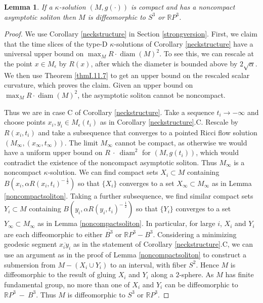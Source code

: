 \documentclass[12pt]{amsart}
\newcommand{\diam}{\operatorname{diam}}
\newcommand{\R}{{\mathbb R}}
\numberwithin{equation}{section}
\theoremstyle{plain}
\newtheorem{lemma}[equation]{Lemma}
\theoremstyle{definition}
\theoremstyle{remark}
\begin{document}
\begin{lemma} \label{S3RP3}
If a $\kappa$-solution $(M, g(\cdot))$
is compact and has a noncompact asymptotic soliton 
then $M$ is diffeomorphic to $S^3$ or $\R P^3$.
\end{lemma}
\begin{proof}
We use Corollary \ref{neckstructure} in Section \ref{strongversion}.
First, we claim that the time slices of the type-D $\kappa$-solutions of
Corollary \ref{neckstructure} have a
universal upper bound on $\max_M R \cdot \diam(M)^2$.
To see this, we can rescale at the point $x \in M_\epsilon$ by
$R(x)$, after which the diameter is bounded above by
$2 \sqrt{\alpha}$. We then use Theorem \ref{thmI.11.7}
to get an upper bound on the rescaled
scalar curvature, which proves the claim. Given an upper bound on 
$\max_M R \cdot \diam(M)^2$, the asymptotic soliton
cannot be noncompact.

Thus we are in case C of Corollary \ref{neckstructure}.
Take a sequence $t_i \rightarrow - \infty$ and choose points $x_i, y_i
\in M_\epsilon(t_i)$ as in Corollary \ref{neckstructure}.C.
Rescale by
$R(x_i, t_i)$ and take a subsequence that converges to a pointed
Ricci flow solution
$(M_\infty, (x_\infty, t_\infty))$. The limit $M_\infty$ cannot be
compact, as otherwise we would have a uniform upper bound on 
$R \: \cdot \: \diam^2$ for $(M, g(t_i))$, which would
contradict the existence of the noncompact asymptotic soliton. 
Thus $M_\infty$ is a noncompact $\kappa$-solution. 
We can find compact sets $X_i \subset M$ 
containing $B(x_i, \alpha R(x_i, t_i)^{- \: \frac12})$ so that
$\{X_i\}$ converges to a set $X_\infty \subset M_\infty$ as in
Lemma \ref{noncompactsoliton}. 
Taking a further subsequence, we find similar compact 
sets $Y_i \subset M$ containing
$B(y_i, \alpha R(y_i, t_i)^{- \: \frac12})$ so that $\{Y_i\}$ converges to
a set $Y_\infty \subset M_\infty$ as in Lemma
\ref{noncompactsoliton}. In particular, for large $i$, $X_i$ and $Y_i$ are
each diffeomorphic to either $\overline{B^3}$ or $\R P^3 - B^3$.
Considering a minimizing geodesic
segment $\overline{x_i y_i}$ as in the statement of
Corollary \ref{neckstructure}.C, we
can use an argument as in the proof of Lemma 
\ref{noncompactsoliton} to construct a submersion from 
$M - (X_i \cup Y_i)$ to an interval, with fiber $S^2$. Hence $M$
is diffeomorphic to the result of gluing $X_i$ and $Y_i$ along
a $2$-sphere.
As $M$ has finite fundamental group, no more
than one of $X_i$ and $Y_i$ can be diffeomorphic to 
$\R P^3 \: - \: {B^3}$. Thus $M$ is diffeomorphic to
$S^3$ or $\R P^3$.
\end{proof}
\end{document}
